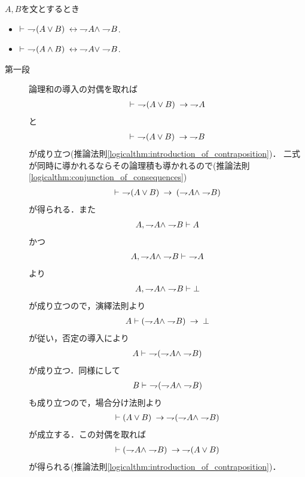 	\begin{screen}
		\begin{logicalthm}[De Morganの法則]
			$A,B$を文とするとき
			\begin{itemize}
				\item $\vdash\ \negation (A \vee B) \lrarrow \negation A \wedge \negation B$.
			
				\item $\vdash\ \negation (A \wedge B) \lrarrow \negation A \vee \negation B$.
			\end{itemize}
		\end{logicalthm}
	\end{screen}
	
	\begin{prf}\mbox{}
		\begin{description}
			\item[第一段]	論理和の導入の対偶を取れば
				\begin{align}
					\vdash\ \negation (A \vee B) \rarrow \negation A
				\end{align}
				と
				\begin{align}
					\vdash\ \negation (A \vee B) \rarrow \negation B
				\end{align}
				が成り立つ(推論法則\ref{logicalthm:introduction_of_contraposition})．
				二式が同時に導かれるならその論理積も導かれるので(推論法則\ref{logicalthm:conjunction_of_consequences})
				\begin{align}
					\vdash\ \negation (A \vee B) \rarrow (\negation A \wedge \negation B)
				\end{align}
				が得られる．また
				\begin{align}
					A, \negation A \wedge \negation B \vdash A
				\end{align}
				かつ
				\begin{align}
					A, \negation A \wedge \negation B \vdash\ \negation A
				\end{align}
				より
				\begin{align}
					A, \negation A \wedge \negation B \vdash \bot
				\end{align}
				が成り立つので，演繹法則より
				\begin{align}
					A \vdash (\negation A \wedge \negation B) \rarrow \bot
				\end{align}
				が従い，否定の導入により
				\begin{align}
					A \vdash\ \negation (\negation A \wedge \negation B)
				\end{align}
				が成り立つ．同様にして
				\begin{align}
					B \vdash\ \negation (\negation A \wedge \negation B)
				\end{align}
				も成り立つので，場合分け法則より
				\begin{align}
					\vdash (A \vee B) \rarrow \negation (\negation A \wedge \negation B)
				\end{align}
				が成立する．この対偶を取れば
				\begin{align}
					\vdash (\negation A \wedge \negation B) \rarrow \negation (A \vee B)
				\end{align}
				が得られる(推論法則\ref{logicalthm:introduction_of_contraposition})．
				

\end{description}
\end{prf}
